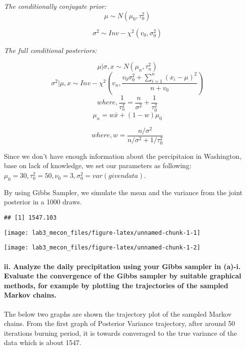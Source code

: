 \documentclass[]{article}
\let\oldparagraph\paragraph
\renewcommand{\paragraph}[1]{\oldparagraph{#1}\mbox{}}
\begin{document}
\emph{The conditionally conjugate prior:}
\[\mu \sim N(\mu_0, \tau_0^2)\]

\[\sigma^2 \sim Inv - \chi^2(v_0,\sigma_0^2)\]

\emph{The full conditional posteriors:}

\[\mu|\sigma,x \sim N(\mu_n, \tau_n^2)\]
\[\sigma^2|\mu,x\sim Inv - \chi^2(v_n, \frac{v_0\sigma^2_0+ \sum^n_{i=1}(x_i-\mu)^2}{n+v_0})\]
\[where, \frac{1}{\tau_n^2} = \frac{n}{\sigma^2}+\frac{1}{\tau_0^2}\]
\[\mu_n = w \bar x+(1-w)\mu_0\]

\[where, w = \frac{n/\sigma^2}{ n/\sigma^2 + 1/\tau^2_0}\]

Since we don't have enough information about the percipitaion in
Washington, base on lack of knowledge, we set our parameters as
following:
\(\mu_0=30, \tau_0^2 = 50, \nu_0 = 3, \sigma^2_0 = var(given data)\).

By using Gibbs Sampler, we simulate the mean and the variance from the
joint posterior in a 1000 draws.

\begin{verbatim}
## [1] 1547.103
\end{verbatim}

\begin{center}\texttt{[image: lab3\_mecon\_files/figure-latex/unnamed-chunk-1-1]} \end{center}

\begin{center}\texttt{[image: lab3\_mecon\_files/figure-latex/unnamed-chunk-1-2]} \end{center}

\hypertarget{ii.-analyze-the-daily-precipitation-using-your-gibbs-sampler-in-a-i.-evaluate-the-convergence-of-the-gibbs-sampler-by-suitable-graphical-methods-for-example-by-plotting-the-trajectories-of-the-sampled-markov-chains.}{%
\paragraph{ii. Analyze the daily precipitation using your Gibbs sampler
in (a)-i. Evaluate the convergence of the Gibbs sampler by suitable
graphical methods, for example by plotting the trajectories of the
sampled Markov
chains.}\label{ii.-analyze-the-daily-precipitation-using-your-gibbs-sampler-in-a-i.-evaluate-the-convergence-of-the-gibbs-sampler-by-suitable-graphical-methods-for-example-by-plotting-the-trajectories-of-the-sampled-markov-chains.}}

The below two graphs are shown the trajectory plot of the sampled Markov
chains. From the first graph of Posterior Variance trajectory, after
around 50 iterations burning period, it is towards converaged to the
true variance of the data which is about 1547.
\end{document}
